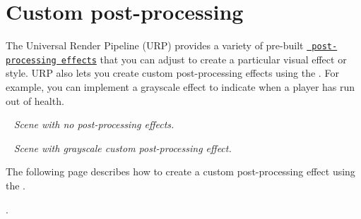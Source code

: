 \chapter{Custom post-\/processing}
\hypertarget{md__hey_tea_9_2_library_2_package_cache_2com_8unity_8render-pipelines_8universal_0d14_80_88_2_dod5c040fd1bde612aeb94afdc7ef41751}{}\label{md__hey_tea_9_2_library_2_package_cache_2com_8unity_8render-pipelines_8universal_0d14_80_88_2_dod5c040fd1bde612aeb94afdc7ef41751}
\label{md__hey_tea_9_2_library_2_package_cache_2com_8unity_8render-pipelines_8universal_0d14_80_88_2_dod5c040fd1bde612aeb94afdc7ef41751_autotoc_md2345}%
%
 The Universal Render Pipeline (URP) provides a variety of pre-\/built \href{https://docs.unity3d.com/Packages/com.unity.render-pipelines.universal@15.0/manual/integration-with-post-processing.html}{\texttt{ post-\/processing effects}} that you can adjust to create a particular visual effect or style. URP also lets you create custom post-\/processing effects using the . For example, you can implement a grayscale effect to indicate when a player has run out of health.

 ~\newline
{\itshape Scene with no post-\/processing effects.}

 ~\newline
{\itshape Scene with grayscale custom post-\/processing effect.}

The following page describes how to create a custom post-\/processing effect using the .


\begin{DoxyItemize}
\item {}. 
\end{DoxyItemize}